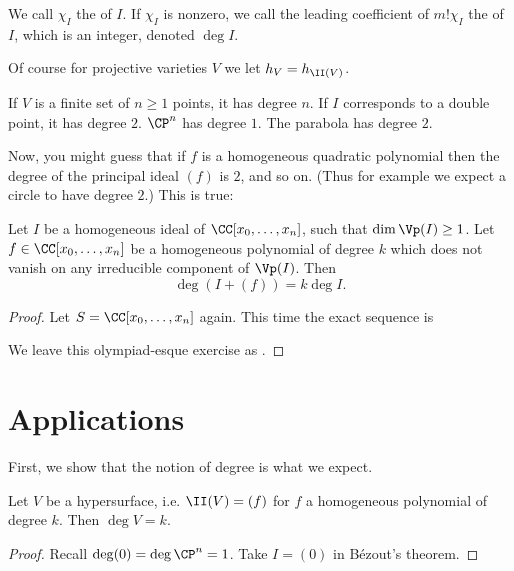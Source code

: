 \begin{definition}
	We call $\chi_I$ the  of $I$.
	If $\chi_I$ is nonzero, we call the leading coefficient of
	$m! \chi_I$ the  of $I$, which is an integer,
	denoted $\deg I$.

	Of course for projective varieties $V$ we let $h_V = h_{\II(V)}$.
\end{definition}

\begin{example}
	\listhack
	\begin{enumerate}[(a)]
		\ii If $V$ is a finite set of $n \ge 1$ points, it has degree $n$.
		\ii If $I$ corresponds to a double point, it has degree $2$.
		\ii $\CP^n$ has degree $1$.
		\ii The parabola has degree $2$.
	\end{enumerate}
\end{example}

Now, you might guess that if $f$ is a homogeneous quadratic polynomial
then the degree of the principal ideal $(f)$ is $2$, and so on.
(Thus for example we expect a circle to have degree $2$.)
This is true:

\begin{theorem}
	Let $I$ be a homogeneous ideal of $\CC[x_0, \dots, x_n]$,
	such that $\dim \Vp(I) \ge 1$.
	Let $f \in \CC[x_0, \dots, x_n]$ be a homogeneous polynomial of degree $k$
	which does not vanish on any irreducible component of $\Vp(I)$.
	Then
	\[ \deg\left( I + (f) \right) = k \deg I. \]
\end{theorem}
\begin{proof}
	Let $S = \CC[x_0, \dots, x_n]$ again.
	This time the exact sequence is
	\begin{center}
	\end{center}
	We leave this olympiad-esque exercise as .
\end{proof}

\section{Applications}
First, we show that the notion of degree is what we expect.
\begin{corollary}
	Let $V$ be a hypersurface, i.e. $\II(V) = (f)$
	for $f$ a homogeneous polynomial of degree $k$.
	Then $\deg V = k$.
\end{corollary}
\begin{proof}
	Recall $\deg(0) = \deg \CP^n = 1$.
	Take $I = (0)$ in B\'ezout's theorem.
\end{proof}

